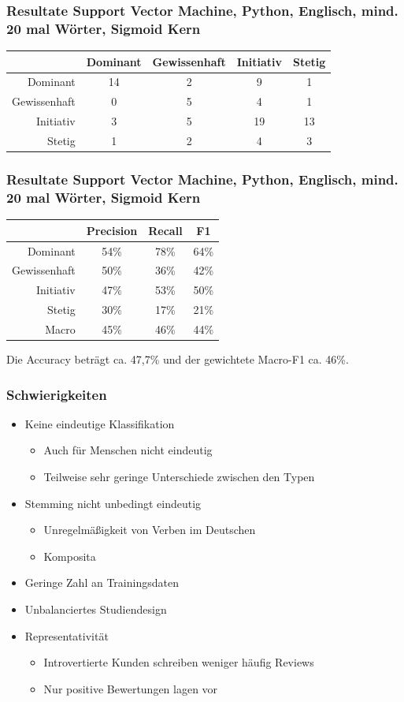 \documentclass{beamer}
\begin{document}
\begin{frame}
\frametitle{Resultate Support Vector Machine, Python, Englisch, mind. 20 mal Wörter, Sigmoid Kern}
\begin{center}
	\begin{tabular}{r|c|c|c|c|}
		&  Dominant  & Gewissenhaft & Initiativ & Stetig\\
		\hline
		Dominant & 14 & 2 & 9 & 1 \\
		Gewissenhaft & 0 & 5 & 4 & 1\\
		Initiativ & 3 & 5 & 19 & 13\\
		Stetig & 1 & 2 & 4 & 3
	\end{tabular}
\end{center}
\end{frame}
\begin{frame}
\frametitle{Resultate Support Vector Machine, Python, Englisch, mind. 20 mal Wörter, Sigmoid Kern}
\begin{center}
\begin{tabular}{r|c|c|c|}
	& Precision  & Recall & F1 \\
	\hline
	Dominant     & 54\% & 78\% & 64\% \\
	Gewissenhaft & 50\% & 36\% & 42\% \\
	Initiativ    & 47\% & 53\% & 50\% \\
	Stetig       & 30\% & 17\% & 21\% \\
	\hline
	Macro        & 45\% & 46\% & 44\%
\end{tabular}
\end{center}
Die Accuracy beträgt ca. 47,7\% und der gewichtete Macro-F1 ca. 46\%.
\end{frame}
\begin{frame}
\frametitle{Schwierigkeiten}
\begin{itemize}
	\item Keine eindeutige Klassifikation
	\begin{itemize}
		\item Auch für Menschen nicht eindeutig
		\item Teilweise sehr geringe Unterschiede zwischen den Typen
	\end{itemize}
	\item Stemming nicht unbedingt eindeutig
	\begin{itemize}
		\item Unregelmäßigkeit von Verben im Deutschen
		\item Komposita
	\end{itemize}
	\item Geringe Zahl an Trainingsdaten
	\item Unbalanciertes Studiendesign
	\item Representativität
	\begin{itemize}
		\item Introvertierte Kunden schreiben weniger häufig Reviews
		\item Nur positive Bewertungen lagen vor
	\end{itemize}
\end{itemize}
\end{frame}
\end{document}
